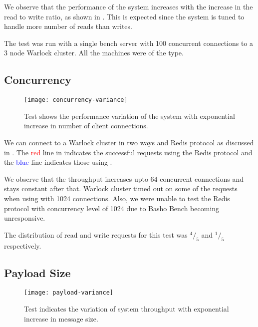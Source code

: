 We observe that the performance of the system increases with the increase in
the read to write ratio, as shown in . This is
expected since the system is tuned to handle more number of reads than writes.

The test was run with a single bench server with 100 concurrent connections to
a 3 node Warlock cluster. All the machines were of the  type.

\subsection{Concurrency}

\begin{figure}
  \begin{whole}
    \texttt{[image: concurrency-variance]}
    \caption[Concurrency Test]{%
      Test shows the performance variation of the system with exponential
      increase in number of client connections.
    }
    \label{figure:res.concurrency}
  \end{whole}
\end{figure}

We can connect to a Warlock cluster in two ways \dash{}  and Redis
protocol
as discussed in . The \textcolor{red}{red} line
in  indicates the successful requests using the
Redis protocol and the \textcolor{blue}{blue} line indicates those using
.

We observe that the throughput increases upto 64 concurrent connections and
stays constant after that. Warlock cluster timed out on some of the requests
when using  with 1024 connections. Also, we were unable to test the
Redis protocol
with concurrency level of 1024 due to Basho Bench becoming unresponsive.

The distribution of read and write requests for this test was ${}^4/_5$ and
${}^1/_5$ respectively.

\subsection{Payload Size}

\begin{figure}
  \begin{whole}
    \texttt{[image: payload-variance]}
    \caption[Payload Throughput Test]{%
      Test indicates the variation of system throughput with exponential
      increase in message size.
    }
    \label{figure:res.payload.throughput}
  \end{whole}
\end{figure}

